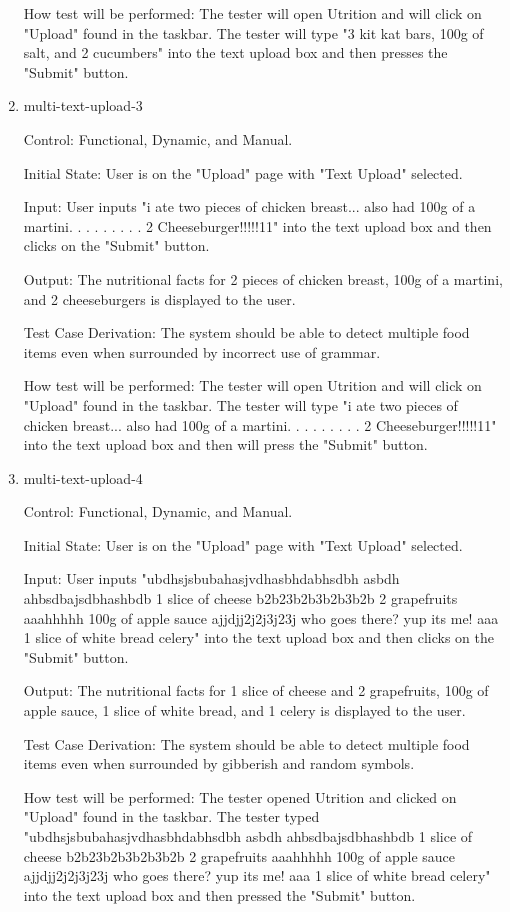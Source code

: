 \documentclass[12pt, titlepage]{article}
\begin{document}
\begin{enumerate}
	How test will be performed: The tester will open Utrition and will click on "Upload" found in the taskbar. The tester will type "3 kit kat bars, 100g of salt, and 2 cucumbers" into the text upload box and then presses the "Submit" button.
	
	\item{multi-text-upload-3\\}
	
	Control: Functional, Dynamic, and Manual.
	
	Initial State: User is on the "Upload" page with "Text Upload" selected.
	
	Input: User inputs "i ate two pieces of chicken breast... also had 100g of a martini. . . . . . . . . 2 Cheeseburger!!!!!11" into the text upload box and then clicks on the "Submit" button.
	
	Output: The nutritional facts for 2 pieces of chicken breast, 100g of a martini, and 2 cheeseburgers is displayed to the user.
	
	Test Case Derivation: The system should be able to detect multiple food items even when surrounded by incorrect use of grammar.
	
	How test will be performed: The tester will open Utrition and will click on "Upload" found in the taskbar. The tester will type "i ate two pieces of chicken breast... also had 100g of a martini. . . . . . . . . 2 Cheeseburger!!!!!11" into the text upload box and then will press the "Submit" button.
	
	\item{multi-text-upload-4\\}
	
	Control: Functional, Dynamic, and Manual.
	
	Initial State: User is on the "Upload" page with "Text Upload" selected.
	
	Input: User inputs "ubdhsjsbubahasjvdhasbhdabhsdbh asbdh ahbsdbajsdbhashbdb 1 slice of cheese b2b23b2b3b2b3b2b 2 grapefruits aaahhhhh 100g of apple sauce ajjdjj2j2j3j23j who goes there? yup its me! aaa 1 slice of white bread celery" into the text upload box and then clicks on the "Submit" button.
	
	Output: The nutritional facts for 1 slice of cheese and 2 grapefruits, 100g of apple sauce, 1 slice of white bread, and 1 celery is displayed to the user.
	
	Test Case Derivation: The system should be able to detect multiple food items even when surrounded by gibberish and random symbols.
	
	How test will be performed: The tester opened Utrition and clicked on "Upload" found in the taskbar. The tester typed "ubdhsjsbubahasjvdhasbhdabhsdbh asbdh ahbsdbajsdbhashbdb 1 slice of cheese b2b23b2b3b2b3b2b 2 grapefruits aaahhhhh 100g of apple sauce ajjdjj2j2j3j23j who goes there? yup its me! aaa 1 slice of white bread celery" into the text upload box and then pressed the "Submit" button.

	\end{enumerate}
\end{document}
